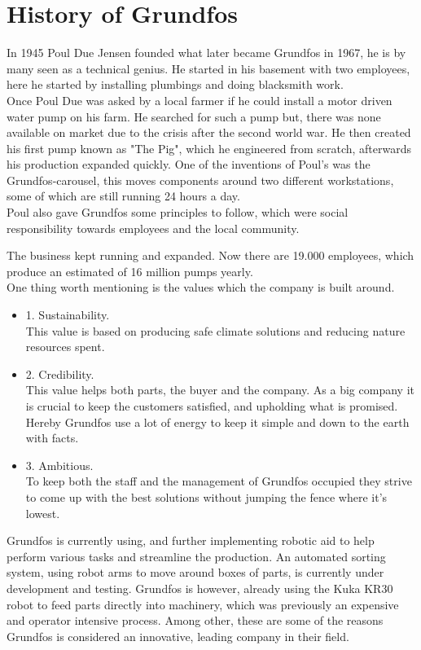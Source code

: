  \chapter{History of Grundfos} \label{ch:History of Grundfos}

In 1945 Poul Due Jensen founded what later became Grundfos in 1967, he is by many seen as a technical genius. He started in his basement with two employees, here he started by installing plumbings and doing blacksmith work.\\

Once Poul Due was asked by a local farmer if he could install a motor driven water pump on his farm. He searched for such a pump but, there was none available on market due to the crisis after the second world war. 
He then created his first pump known as "The Pig", which he engineered from scratch, afterwards his production expanded quickly. 
One of the inventions of Poul's was the Grundfos-carousel, this moves components around two different workstations, some of which are still running 24 hours a day.\\

Poul also gave Grundfos some principles to follow, which were social responsibility towards employees and the local community.

The business kept running and expanded. Now there are 19.000 employees, which produce an estimated of 16 million pumps yearly.\\
One thing worth mentioning is the values which the company is built around.\\

\begin{itemize}
   
\item 1. Sustainability.\\ This value is based on producing safe climate solutions and reducing nature resources spent.\\
\item 2. Credibility.\\ This value helps both parts, the buyer and the company. As a big company it is crucial to keep the customers satisfied, and upholding what is promised. Hereby Grundfos use a lot of energy to keep it simple and down to the earth with facts.\\
\item 3. Ambitious.\\ To keep both the staff and the management of Grundfos occupied they strive to come up with the best solutions without jumping the fence where it's lowest.\\
\end{itemize}
Grundfos is currently using, and further implementing robotic aid to help perform various tasks and streamline the production. An automated sorting system, using robot arms to move around boxes of parts, is currently under development and testing. Grundfos is however, already using the Kuka KR30 robot to feed parts directly into machinery, which was previously an expensive and operator intensive process. Among other, these are some of the reasons Grundfos is considered an innovative, leading company in their field. \cite{1Grundfos}

